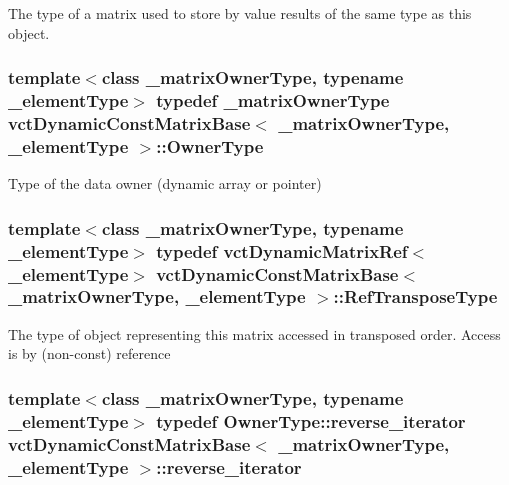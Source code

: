 The type of a matrix used to store by value results of the same type as this object. \hypertarget{classvct_dynamic_const_matrix_base_a2e37ebc2ac741d4346d21f986e625e96}{
\subsubsection[{Owner\-Type}]{\setlength{\rightskip}{0pt plus 5cm}template$<$class \-\_\-matrix\-Owner\-Type, typename \-\_\-element\-Type$>$ typedef \-\_\-matrix\-Owner\-Type {\bf vct\-Dynamic\-Const\-Matrix\-Base}$<$ \-\_\-matrix\-Owner\-Type, \-\_\-element\-Type $>$\-::{\bf Owner\-Type}}}\label{classvct_dynamic_const_matrix_base_a2e37ebc2ac741d4346d21f986e625e96}
Type of the data owner (dynamic array or pointer) \hypertarget{classvct_dynamic_const_matrix_base_afff0f3bee56a8562e0ec772b35e24475}{
\subsubsection[{Ref\-Transpose\-Type}]{\setlength{\rightskip}{0pt plus 5cm}template$<$class \-\_\-matrix\-Owner\-Type, typename \-\_\-element\-Type$>$ typedef {\bf vct\-Dynamic\-Matrix\-Ref}$<$\-\_\-element\-Type$>$ {\bf vct\-Dynamic\-Const\-Matrix\-Base}$<$ \-\_\-matrix\-Owner\-Type, \-\_\-element\-Type $>$\-::{\bf Ref\-Transpose\-Type}}}\label{classvct_dynamic_const_matrix_base_afff0f3bee56a8562e0ec772b35e24475}
The type of object representing this matrix accessed in transposed order. Access is by (non-\/const) reference \hypertarget{classvct_dynamic_const_matrix_base_a53905f35527b9ce433c246ab50a6b812}{
\subsubsection[{reverse\-\_\-iterator}]{\setlength{\rightskip}{0pt plus 5cm}template$<$class \-\_\-matrix\-Owner\-Type, typename \-\_\-element\-Type$>$ typedef Owner\-Type\-::reverse\-\_\-iterator {\bf vct\-Dynamic\-Const\-Matrix\-Base}$<$ \-\_\-matrix\-Owner\-Type, \-\_\-element\-Type $>$\-::{\bf reverse\-\_\-iterator}}}\label{classvct_dynamic_const_matrix_base_a53905f35527b9ce433c246ab50a6b812}
